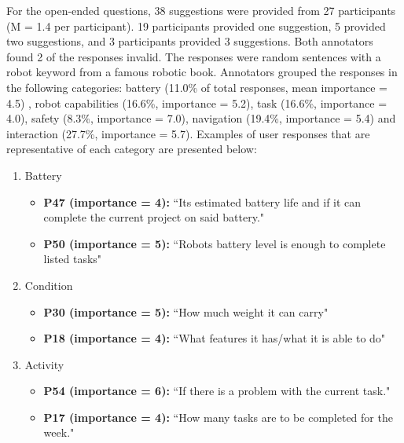 \documentclass[letterpaper, 10 pt, conference]{ieeeconf}  %
\begin{document}
For the open-ended questions, 38 suggestions were provided from 27 participants (M = 1.4 per participant). 19 participants provided one suggestion, 5 provided two suggestions, and 3 participants provided 3 suggestions. Both annotators found 2 of the responses invalid. The responses were random sentences with a robot keyword from a famous robotic book. Annotators grouped the responses in the following categories: battery (11.0\% of total responses, mean importance = 4.5) , robot capabilities (16.6\%, importance = 5.2), task (16.6\%, importance = 4.0), safety (8.3\%, importance = 7.0), navigation (19.4\%, importance = 5.4) and interaction (27.7\%, importance = 5.7). Examples of user responses that are representative of each category are presented below:


\begin{enumerate}
\item Battery
    \begin{itemize}
        \item  \textbf{P47 (importance = 4):} ``Its estimated battery life and if it can complete the current project on said battery."
        \item  \textbf{P50 (importance = 5):} ``Robots battery level is enough to complete listed tasks"
    \end{itemize}
    
\item Condition
    \begin{itemize}
        \item  \textbf{P30 (importance = 5):} ``How much weight it can carry"
        \item  \textbf{P18 (importance = 4):} ``What features it has/what it is able to do"
    \end{itemize}

\item Activity
    \begin{itemize}
        \item  \textbf{P54 (importance = 6):} ``If there is a problem with the current task."
        \item  \textbf{P17 (importance = 4):} ``How many tasks are to be completed for the week."
    \end{itemize}
    

\end{enumerate}
\end{document}
